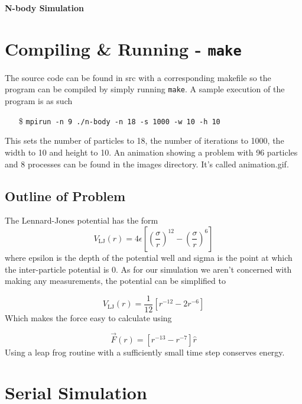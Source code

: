 \documentclass[11pt]{article}
\begin{document}
\vspace*{3mm}
\noindent
{\centering\textbf{\Large N-body Simulation}\\}
\vspace*{8mm}

\section*{Compiling \& Running - \texttt{make}}
The source code can be found in src with a corresponding makefile so the program can be compiled by simply running \verb!make!. A sample execution of the program is as such 
\begin{itemize}
\item[\$] \texttt{mpirun -n 9 ./n-body -n 18 -s 1000 -w 10 -h 10}
\end{itemize}  
This sets the number of particles to 18, the number of iterations to 1000, the width to 10 and height to 10. An animation showing a problem with 96 particles and 8 processes can be found in the images directory. It's called animation.gif.

\subsection*{Outline of Problem}

The Lennard-Jones potential has the form
\begin{equation}
  V_{\textrm{LJ}}(r) = 4\epsilon\left[\left(\frac{\sigma}{r}\right)^{12} 
                  - \left(\frac{\sigma}{r} \right)^6\right]
\end{equation}
where epsilon is the depth of the potential well and sigma is the point at which the inter-particle potential is 0. As for our simulation we aren't concerned with making any measurements, the potential can be simplified to 

\begin{equation}
  V_{\textrm{LJ}}(r) = \frac{1}{12}\left[r^{-12} - 2{r}^{-6}\right]
\end{equation}
Which makes the force easy to calculate using

\begin{equation}
  \vec{F}(r) = \left[r^{-13} - {r}^{-7}\right] \hat{r}
\end{equation}
Using a leap frog routine with a sufficiently small time step conserves energy.
\pagebreak
\section*{Serial Simulation}
\end{document}
